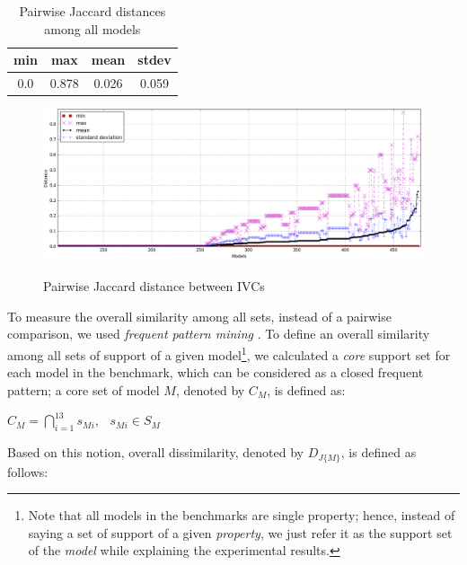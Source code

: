 \begin{table}
  \caption{Pairwise Jaccard distances among all models}
  \centering
  \begin{tabular}{ |c|c|c|c| }
    \hline
     min & max & mean & stdev \\[0.5ex]
    \hline
     0.0   & 0.878 & 0.026 & 0.059 \\[0.5ex]
    \hline
  \end{tabular}
  \label{tab:jaccard-avg}
\end{table}

\begin{figure}
  \centering
  \vspace{3mm}
  \includegraphics[width=\textwidth]{figs/jacdis2.png} \\
  \vspace{-0.1in}
  \caption{Pairwise Jaccard distance between IVCs}\label{fig:jacdis}
\end{figure}

\iffalse 

To measure the overall similarity among all sets, instead of a pairwise comparison, we used \emph{frequent pattern mining} \cite{han2007frequent}. To define an overall similarity among all sets of support of a given model\footnote{Note that all models in the benchmarks are single property; hence, instead of saying a set of support of a given \emph{property}, we just refer it as the support set of the \emph{model} while explaining the experimental results.}, we calculated a \emph{core} support set for each model in the benchmark, which can be considered as a closed frequent pattern; a core set of model $M$, denoted by $C_M$, is defined as:
\begin{definition}
  \label{def:core}
  $C_M = \bigcap_{i=1}^{13} s_{Mi},   \hspace{9pt} s_{Mi} \in S_M$
\end{definition}

Based on this notion, overall dissimilarity, denoted by $D_{J\{M\}}$, is defined as follows:

